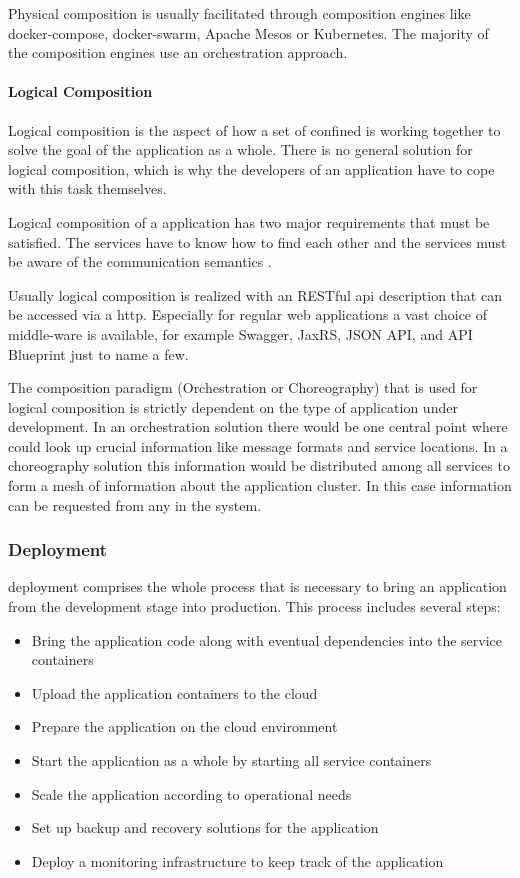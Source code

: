 Physical composition is usually facilitated through composition engines like
docker-compose, docker-swarm, Apache Mesos or Kubernetes. The majority of the
composition engines use an orchestration approach.

\paragraph{Logical Composition}

Logical composition is the aspect of how a set of confined \mss{} is working
together to solve the goal of the application as a whole. There is no
general solution for logical composition, which is why the developers of an
application have to cope with this task themselves.

Logical composition of a \ms{} application has two major requirements that must
be satisfied. The services have to know how to find each other
\cite{rotter2017telecom} and the services must be aware of the communication
semantics \cite{oberhauser2016microflows}.

Usually logical composition is realized with an RESTful \gls{api} description
that can be accessed via a \gls{http}. Especially for regular web applications a
vast choice of middle-ware is available, for example Swagger, JaxRS, JSON API,
and API Blueprint just to name a few.

The composition paradigm (Orchestration or Choreography) that is used for
logical composition is strictly dependent on the type of application under
development. In an orchestration solution there would be one central point where
\mss{} could look up crucial information like message formats and service
locations. In a choreography solution this information would be distributed
among all services to form a mesh of information about the application cluster.
In this case information can be requested from any \ms{} in the system.

\subsubsection{\msuc{} Deployment}

\msuc{} deployment comprises the whole process that is necessary to bring an
application from the development stage into production. This process includes
several steps:

\begin{itemize}
  \item Bring the application code along with eventual dependencies into the
  service containers
  \item Upload the application containers to the cloud
  \item Prepare the application on the cloud environment
  \item Start the application as a whole by starting all service containers
  \item Scale the application according to operational needs
  \item Set up backup and recovery solutions for the application
  \item Deploy a monitoring infrastructure to keep track of the application
\end{itemize}

